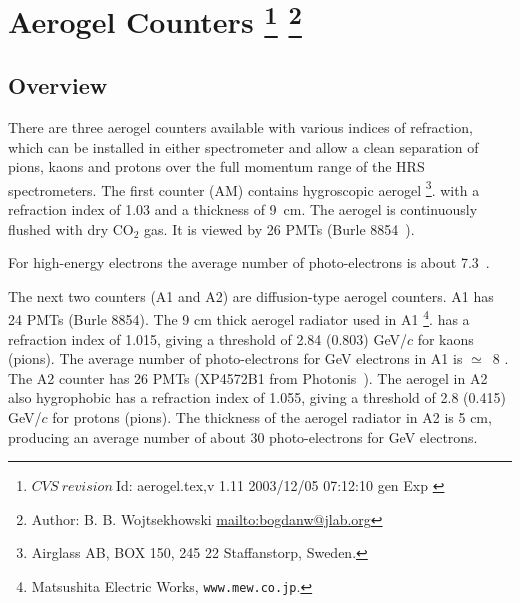 \chapter[Aerogel \Cherenkov{} Counter]{Aerogel \Cherenkov{} Counters
\footnote{
  $CVS~revision~ $Id: aerogel.tex,v 1.11 2003/12/05 07:12:10 gen Exp $ $
}
\footnote{Author: B. B. Wojtsekhowski \url{mailto:bogdanw@jlab.org}}
}
\label{chap:hrs-aerogel}

\section{Overview}

There are three aerogel \Cherenkov{} counters available with various indices
of refraction, which can be installed in either spectrometer 
and allow a clean separation of pions, kaons and protons over 
the full momentum range of the HRS spectrometers.
The first counter (AM) contains hygroscopic aerogel
\footnote{Airglass AB, BOX 150, 245 22 Staffanstorp, Sweden.}.
with a refraction index of 1.03 and a thickness of 9~cm. 
The aerogel is continuously flushed with dry CO$_{2}$ gas.  
It is viewed by 26 PMTs (Burle 8854~\cite{BurleInd}).

For high-energy electrons the average 
number of photo-electrons is about 7.3~\cite{Brash:2002vn}.

The next two counters (A1 and A2) are diffusion-type aerogel counters.
A1 has 24 PMTs (Burle 8854). The 9 cm thick aerogel radiator used in A1
\footnote{ Matsushita Electric Works, {\tt www.mew.co.jp}.}.
has a refraction index of 1.015, giving a threshold of 2.84 (0.803) GeV/$c$ for
kaons (pions). The average number of photo-electrons for GeV electrons
in A1 is $\simeq$~8%
.
 The A2 counter has 26 PMTs
(XP4572B1 from Photonis~\cite{PhotonisInd}).
The aerogel in A2 also hygrophobic has a refraction index of 1.055, 
giving a threshold of 2.8 (0.415) GeV/$c$ for protons (pions). 
The thickness of the aerogel radiator in A2 is 5 cm, producing an average
number of about 30 photo-electrons for GeV electrons.

